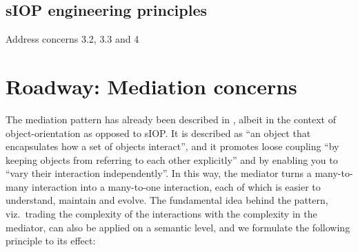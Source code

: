 \documentclass[sort&compress,preprint,authoryear,3p,twocolumn]{elsarticle}
\begin{document}
\hypertarget{siop-engineering-principles}{%
\subsection{sIOP engineering
principles}\label{siop-engineering-principles}}

Address concerns 3.2, 3.3 and 4

\hypertarget{roadway-mediation-concerns}{%
\section{Roadway: Mediation concerns}\label{roadway-mediation-concerns}}

The mediation pattern has already been described in \citep{Gamma1994},
albeit in the context of object-orientation as opposed to sIOP. It is
described as ``an object that encapsulates how a set of objects
interact'', and it promotes loose coupling ``by keeping objects from
referring to each other explicitly'' and by enabling you to ``vary their
interaction independently''. In this way, the mediator turns a
many-to-many interaction into a many-to-one interaction, each of which
is easier to understand, maintain and evolve. The fundamental idea
behind the pattern, viz.~trading the complexity of the interactions with
the complexity in the mediator, can also be applied on a semantic level,
and we formulate the following principle to its effect:
\end{document}
